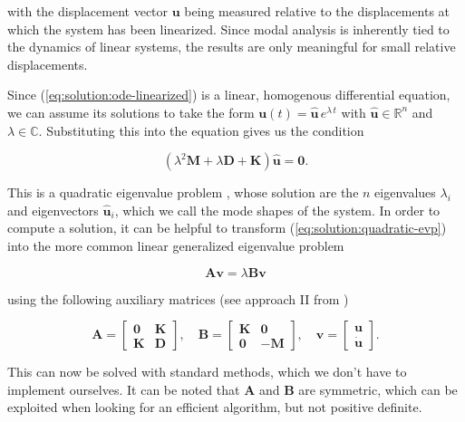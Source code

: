 with the displacement vector $\boldsymbol{u}$ being measured relative to the displacements at which the system has been linearized.
Since modal analysis is inherently tied to the dynamics of linear systems, the results are only meaningful for small relative displacements.

Since (\ref{eq:solution:ode-linearized}) is a linear, homogenous differential equation, we can assume its solutions to take the form $\boldsymbol{u}(t) = \hat{\boldsymbol{u}}\,e^{\lambda\,t}$ with $\hat{\boldsymbol{u}} \in \mathbb{R}^n$ and $\lambda \in \mathbb{C}$. Substituting this into the equation gives us the condition

\begin{equation}
\left(\lambda^2 \boldsymbol{M} + \lambda \boldsymbol{D} + \boldsymbol{K}\right)\hat{\boldsymbol{u}} = \boldsymbol{0}. \label{eq:solution:quadratic-evp}
\end{equation}

This is a quadratic eigenvalue problem \cite{bib:dw07}, whose solution are the $n$ eigenvalues $\lambda_{i}$ and eigenvectors $\hat{\boldsymbol{u}}_{i}$, which we call the mode shapes of the system.
In order to compute a solution, it can be helpful to transform (\ref{eq:solution:quadratic-evp}) into the more common linear generalized eigenvalue problem

\begin{equation}
\boldsymbol{A}\boldsymbol{v} = \lambda\boldsymbol{B}\boldsymbol{v}
\end{equation}

using the following auxiliary matrices (see approach II from \cite{bib:dw07})

\begin{equation}
\boldsymbol{A}
=
\begin{bmatrix}
\boldsymbol{0} & \boldsymbol{K} \\
\boldsymbol{K} & \boldsymbol{D}
\end{bmatrix},
\quad
\boldsymbol{B}
=
\begin{bmatrix}
\boldsymbol{K} & \boldsymbol{0} \\
\boldsymbol{0} & \boldsymbol{-M}
\end{bmatrix},
\quad
\boldsymbol{v}
=
\begin{bmatrix}
\boldsymbol{u} \\
\dot{\boldsymbol{u}}
\end{bmatrix}.
\end{equation}

This can now be solved with standard methods, which we don't have to implement ourselves.
It can be noted that $\boldsymbol{A}$ and $\boldsymbol{B}$ are symmetric, which can be exploited when looking for an efficient algorithm, but not positive definite.

